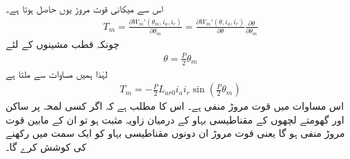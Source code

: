 اس سے میکانی قوت مروڑ  یوں حاصل ہوتا ہے۔
\begin{align}\label{مساوات_گھومتے_مشین_مروڑ_بذریعہ_توانائی}
T_m=\frac{\partial W_m'(\theta_m,i_a,i_r)}{\partial \theta_m}=\frac{\partial W_m'(\theta,i_a,i_r)}{\partial \theta} \frac{\partial \theta}{\partial \theta_m}
\end{align}
چونکہ  قطب مشینوں کے لئے
\begin{align}
\theta=\frac{P}{2} \theta_m
\end{align}
لہٰذا ہمیں مساوات   سے ملتا ہے
\begin{align}\label{مساوات_گھومتے_مشین_مروڑ_بذریعہ_کوتوانائی}
T_m=-\frac{P}{2} L_{ar0} i_a i_r \sin \left(\frac{P}{2} \theta_m\right)
\end{align}
اس مساوات میں قوت مروڑ  منفی ہے۔ اس کا مطلب ہے کہ اگر کسی لمحہ پر ساکن اور گھومتے لچھوں کے مقناطیسی بہاو کے درمیان زاویہ مثبت ہو تو ان کے مابین قوت مروڑ منفی ہو گا یعنی قوت مروڑ ان دونوں مقناطیسی بہاو کو ایک سمت میں رکھنے کی کوشش کرے گا۔

